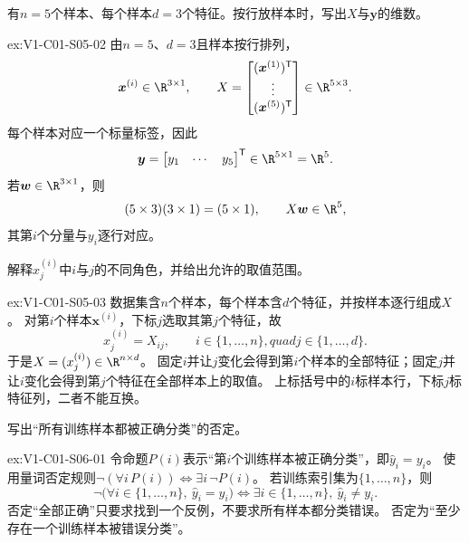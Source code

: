 \begin{SLChapterExercisePairSection}
\begin{exercise}[数据矩阵]\label{ex:V1-C01-S05-02}
有$n=5$个样本、每个样本$d=3$个特征。按行放样本时，写出$X$与$\boldsymbol{y}$的维数。
\end{exercise}
\label{sol:V1-C01-S05-02}
\begin{chapterexercisesolution}{ex:V1-C01-S05-02}
由$n=5$、$d=3$且样本按行排列，
\[
\boldsymbol{x}^{(i)}\in\R^{3\times1},\qquad
X=
\begin{bmatrix}
(\boldsymbol{x}^{(1)})^{\mathsf T}\\
\vdots\\
(\boldsymbol{x}^{(5)})^{\mathsf T}
\end{bmatrix}
\in\R^{5\times3}.
\]
每个样本对应一个标量标签，因此
\[
\boldsymbol{y}=
\begin{bmatrix}y_1&\cdots&y_5\end{bmatrix}^{\mathsf T}
\in\R^{5\times1}=\R^5.
\]
若$\boldsymbol{w}\in\R^{3\times1}$，则
\[
(5\times3)(3\times1)=(5\times1),
\qquad X\boldsymbol{w}\in\R^5,
\]
其第$i$个分量与$y_i$逐行对应。
\end{chapterexercisesolution}

\begin{exercise}[双重下标]\label{ex:V1-C01-S05-03}
解释$x^{(i)}_j$中$i$与$j$的不同角色，并给出允许的取值范围。
\end{exercise}
\label{sol:V1-C01-S05-03}
\begin{chapterexercisesolution}{ex:V1-C01-S05-03}
\SolGiven 数据集含$n$个样本，每个样本含$d$个特征，并按样本逐行组成$X$。
\SolDerive 对第$i$个样本$\boldsymbol{x}^{(i)}$，下标$j$选取其第$j$个特征，故
\[
x_j^{(i)}=X_{ij},\qquad
i\in\{1,\ldots,n\},quad j\in\{1,\ldots,d\}.
\]
于是$X=(x_j^{(i)})\in\R^{n\times d}$。
\SolCheck 固定$i$并让$j$变化会得到第$i$个样本的全部特征；固定$j$并让$i$变化会得到第$j$个特征在全部样本上的取值。
\SolAnswer 上标括号中的$i$标样本行，下标$j$标特征列，二者不能互换。
\end{chapterexercisesolution}

\begin{exercise}[量词否定]\label{ex:V1-C01-S06-01}
写出“所有训练样本都被正确分类”的否定。
\end{exercise}
\label{sol:V1-C01-S06-01}
\begin{chapterexercisesolution}{ex:V1-C01-S06-01}
\SolGiven 令命题$P(i)$表示“第$i$个训练样本被正确分类”，即$\widehat y_i=y_i$。
\SolPlan 使用量词否定规则$\neg(\forall i\,P(i))\Leftrightarrow\exists i\,\neg P(i)$。
\SolDerive 若训练索引集为$\{1,\ldots,n\}$，则
\[
\neg\bigl(\forall i\in\{1,\ldots,n\},\ \widehat y_i=y_i\bigr)
\Longleftrightarrow
\exists i\in\{1,\ldots,n\},\ \widehat y_i\ne y_i.
\]
\SolCheck 否定“全部正确”只要求找到一个反例，不要求所有样本都分类错误。
\SolAnswer 否定为“至少存在一个训练样本被错误分类”。
\end{chapterexercisesolution}


\end{SLChapterExercisePairSection}
